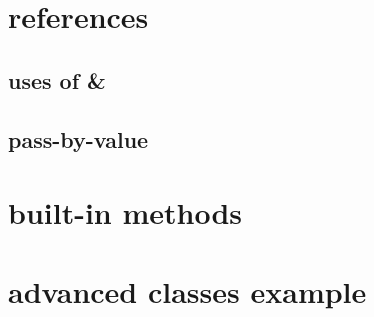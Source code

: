 

\section{references}



\subsection{uses of \&}



\subsection{pass-by-value}



\section{built-in methods}



\section{advanced classes example}


